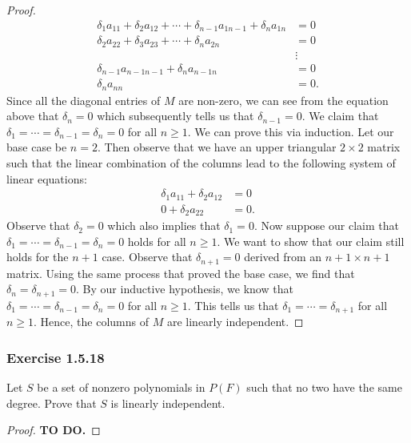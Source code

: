 \begin{proof}
\begin{align*}
    \delta_{1} a_{11} + \delta_{2} a_{12} + \cdots + \delta_{n-1} a_{1 n - 1} +  \delta_{n} a_{1n} &= 0 \\
      \delta_{2} a_{22} + \delta_{3} a_{23} + \cdots +  \delta_{n}  a_{2n} &= 0 \\
                                                                         &\vdots  \\
                                                                     \delta_{n-1} a_{n-1 n-1 } + \delta_{n} a_{n-1 n }     &= 0 \\
                                                                     \delta_{n} a_{n n } &= 0.
\end{align*}
Since all the diagonal entries of \( M  \) are non-zero, we can see from the equation above that \( \delta_{n } = 0  \) which subsequently tells us that \(  \delta_{n -1 } = 0  \). We claim that \( \delta_{1} =  \cdots =  \delta_{n-1} = \delta_{n } = 0  \) for all \( n \geq 1  \). We can prove this via induction. Let our base case be \( n = 2  \). Then observe that we have an upper triangular \( 2 \times 2  \) matrix such that the linear combination of the columns lead to the following system of linear equations:
\begin{align*}
    \delta_{1} a_{11} + \delta_{2} a_{12} &= 0 \\
    0 + \delta_{2} a_{22} &= 0. 
\end{align*}
Observe that \( \delta_{2} = 0  \) which also implies that \( \delta_{1} =0  \). Now suppose our claim that \( \delta_{1} = \cdots =  \delta_{n-1} = \delta_{n} = 0   \) holds for all \( n \geq  1  \). We want to show that our claim still holds for the \( n + 1  \) case. Observe that \( \delta_{n + 1} = 0   \) derived from an \( n + 1 \times n  + 1  \) matrix. Using the same process that proved the base case, we find that \(  \delta_{n} = \delta_{n+1} = 0  \). By our inductive hypothesis, we know that \( \delta_{1} = \cdots =  \delta_{n-1} = \delta_{n} = 0  \) for all \( n \geq 1  \). This tells us that \( \delta_{1} = \cdots = \delta_{n+1} \) for all \( n \geq 1  \).  Hence, the columns of \( M  \) are linearly independent.  


\end{proof}

\subsubsection{Exercise 1.5.18} Let \( S  \) be a set of nonzero polynomials in \( P(F) \) such that no two have the same degree. Prove that \( S  \) is linearly independent.
\begin{proof}
\textbf{TO DO.}
\end{proof}

